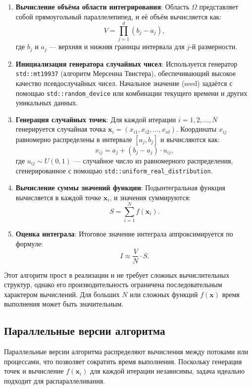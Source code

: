 \documentclass[12pt,a4paper]{extarticle}
\begin{document}
\begin{enumerate}
    \item \textbf{Вычисление объёма области интегрирования}: Область \(\Omega\) представляет собой прямоугольный параллелепипед, и её объём вычисляется как:
    \[
    V = \prod_{j=1}^d (b_j - a_j),
    \]
    где \(b_j\) и \(a_j\) — верхняя и нижняя границы интервала для \(j\)-й размерности.

    \item \textbf{Инициализация генератора случайных чисел}: Используется генератор \texttt{std::mt19937} (алгоритм Мерсенна Твистера), обеспечивающий высокое качество псевдослучайных чисел. Начальное значение (seed) задаётся с помощью \texttt{std::random\_device} или комбинации текущего времени и других уникальных данных.

    \item \textbf{Генерация случайных точек}: Для каждой итерации \(i = 1, 2, \ldots, N\) генерируется случайная точка \(\mathbf{x}_i = (x_{i1}, x_{i2}, \ldots, x_{id})\). Координаты \(x_{ij}\) равномерно распределены в интервале \([a_j, b_j]\) и вычисляются как:
    \[
    x_{ij} = a_j + (b_j - a_j) \cdot u_{ij},
    \]
    где \(u_{ij} \sim U(0, 1)\) — случайное число из равномерного распределения, сгенерированное с помощью \texttt{std::uniform\_real\_distribution}.

    \item \textbf{Вычисление суммы значений функции}: Подынтегральная функция вычисляется в каждой точке \(\mathbf{x}_i\), и значения суммируются:
    \[
    S = \sum_{i=1}^N f(\mathbf{x}_i).
    \]

    \item \textbf{Оценка интеграла}: Итоговое значение интеграла аппроксимируется по формуле:
    \[
    I \approx \frac{V}{N} \cdot S.
    \]
\end{enumerate}

Этот алгоритм прост в реализации и не требует сложных вычислительных структур, однако его производительность ограничена последовательным характером вычислений. Для больших \(N\) или сложных функций \(f(\mathbf{x})\) время выполнения может быть значительным.

\subsection{Параллельные версии алгоритма}
Параллельные версии алгоритма распределяют вычисления между потоками или процессами, что позволяет сократить время выполнения. Поскольку генерация точек и вычисление \(f(\mathbf{x}_i)\) для каждой итерации независимы, задача идеально подходит для распараллеливания.
\end{document}
